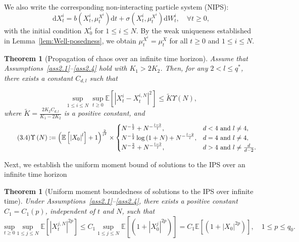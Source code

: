 \documentclass[12pt]{article}
\numberwithin{equation}{section}
\newtheorem{theorem}[assumption]{Theorem}   %
\begin{document}
We also write  the corresponding non-interacting particle system (NIPS):
\begin{equation}\tag{3.2}\label{noninteracting}
\mathrm{d} X_t^i=b\left(X_t^i, \mu_t^{X^i}\right) \mathrm{d} t+\sigma\left(X_t^i, \mu_t^{X^i}\right) \mathrm{d} W_t^i, \quad \forall t \geq 0,
\end{equation}
with the initial condition $X_0^i$ for $1 \leq i \leq N$. By the weak uniqueness established in Lemma~\ref{lem:Well-posedness}, we obtain $\mu_t^{X^i} = \mu_t^X$ for all $t \geq 0$ and $1 \leq i \leq N$. 
\begin{theorem}[Propagation of chaos over an infinite time horizon]\label{propagationofchaos}
Assume that Assumptions~\ref{ass2.1}--\ref{ass2.4} hold with $K_1 > 2K_2$. Then, for any $2 < l \leq q^*$, there exists a constant $C_{d,l}$ such that

\begin{equation}\tag{3.3}\label{3.4}
\underset{1\leqslant i\leqslant N}{\sup}\underset{t\geqslant 0}{\sup}\mathbb{E} \left[ \left| X_{t}^{i}-X_{t}^{i,N} \right|^2 \right] \le \widetilde{K}\Upsilon \left(N\right),
\end{equation}
where 
$\widetilde{K}=\tfrac{2K_2C_{d,l}}{K_1-2K_2}
$ is a positive constant, and
\begin{equation}\tag{3.4}\label{3.5}
\Upsilon \left(N\right):= \left( \mathbb{E} \left[ \left| X_0 \right|^{l} \right] +1 \right) ^{\frac{2}{l^2}}\times\begin{cases}N^{-\frac{1}{2}}+N^{-\frac{{l}-2}{l}}, & d<4 \text { and } {l} \neq 4, \\ N^{-\frac{1}{2}} \log \left(1+N\right)+N^{-\frac{{l}-2}{{l}}}, & d=4 \text { and } {l} \neq 4, \\ N^{-\frac{2}{d}}+N^{-\frac{{l}-2}{l}}, & d>4 \text { and } {l} \neq \frac{d}{d-2}.\end{cases} \\
\end{equation}
\end{theorem}
Next, we establish the uniform moment bound  of solutions to the IPS over an infinite time horizon
\begin{theorem}[Uniform moment boundedness of solutions to the IPS over infinite time]\label{momentboundednessofthesolution}
Under Assumptions~\ref{ass2.1}--\ref{ass2.4}, there exists a positive constant $C_1 = C_1\left(p\right)$, independent of $t$ and $N$, such that
\begin{equation}\tag{3.5}\label{3.25}
\underset{t\geqslant 0}{\mathrm{sup}}\underset{1\leqslant j\leqslant N}{\sup} \mathbb{E}\left[\left|X^{j,N}_{t}\right|^{2 p}\right] \leq C_1\underset{1\leqslant j\leqslant N}{\sup} \mathbb{E}\left[\left(1+\left|X_0^{j}\right|^{2 p}\right)\right]=C_1\mathbb{E}\left[\left(1+\left|X_0\right|^{2 p}\right)\right], \quad 1 \leq p \leq q_0.
\end{equation}
\end{theorem}
\end{document}

